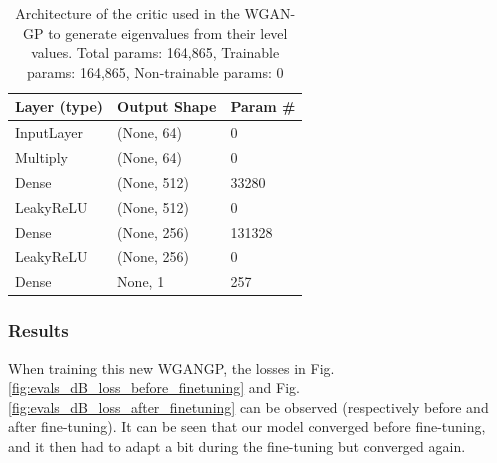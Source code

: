 \documentclass{article}
\begin{document}
\begin{table}[]
    \begin{tabular}{|l|l|l|}
        \hline
        \textbf{Layer (type)} & \textbf{Output Shape} & \textbf{Param \#} \\ \hline
        InputLayer            & (None, 64)            & 0                 \\ \hline
        Multiply              & (None, 64)            & 0                 \\ \hline
        Dense                 & (None, 512)           & 33280             \\ \hline
        LeakyReLU             & (None, 512)           & 0                 \\ \hline
        Dense                 & (None, 256)           & 131328            \\ \hline
        LeakyReLU             & (None, 256)           & 0                 \\ \hline
        Dense                 & None, 1               & 257               \\ \hline
    \end{tabular}
    \caption{Architecture of the critic used in the WGAN-GP to generate eigenvalues from their level values. Total params: 164,865, Trainable params: 164,865, Non-trainable params: 0}
    \label{tab:evals_dB_critic_WGANGP_architecture}
\end{table}

\subsubsection{Results}

When training this new WGANGP, the losses in Fig.\ref{fig:evals_dB_loss_before_finetuning} and Fig.\ref{fig:evals_dB_loss_after_finetuning} can be observed (respectively before and after fine-tuning). It can be seen that our model converged before fine-tuning, and it then had to adapt a bit during the fine-tuning but converged again.
\end{document}
